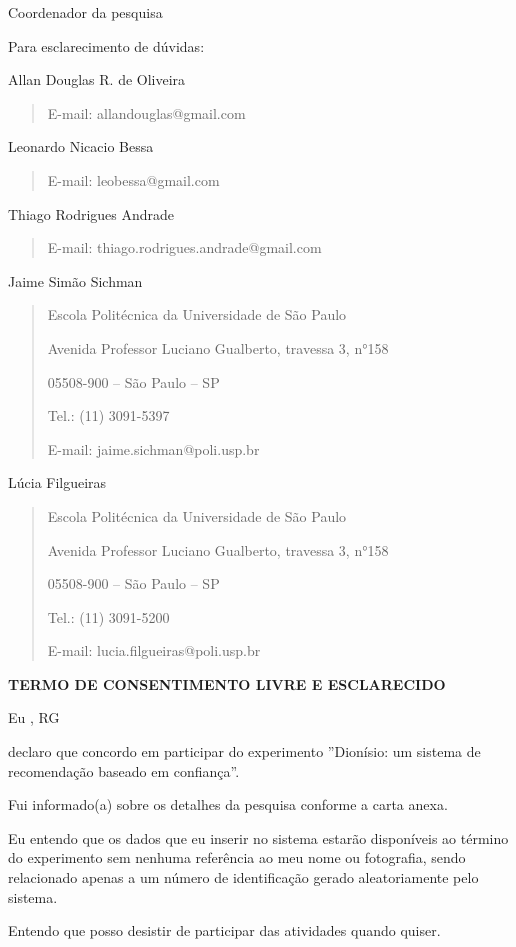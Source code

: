 Coordenador da pesquisa

\vspace{0.2in}

Para esclarecimento de dúvidas:

Allan Douglas R. de Oliveira
\begin{quote}
	E-mail: allandouglas@gmail.com
\end{quote}
Leonardo Nicacio Bessa
\begin{quote}
	E-mail: leobessa@gmail.com
\end{quote}	
Thiago Rodrigues Andrade
\begin{quote}
	E-mail: thiago.rodrigues.andrade@gmail.com
\end{quote}
Jaime Simão Sichman
\begin{quote}
Escola Politécnica da Universidade de São Paulo

Avenida Professor Luciano Gualberto, travessa 3, n°158

05508-900 – São Paulo – SP

Tel.: (11) 3091-5397

E-mail: jaime.sichman@poli.usp.br
\end{quote}
Lúcia Filgueiras
\begin{quote}
Escola Politécnica da Universidade de São Paulo

Avenida Professor Luciano Gualberto, travessa 3, n°158

05508-900 – São Paulo – SP

Tel.: (11) 3091-5200

E-mail: lucia.filgueiras@poli.usp.br
\end{quote}
\vspace{3.5in}
\centerline{\textbf{TERMO DE CONSENTIMENTO LIVRE E ESCLARECIDO}}

Eu \hspace{9.5cm}, RG \hspace{4.5cm} 

declaro que concordo em participar do experimento ''Dionísio: um sistema de recomendação baseado em confiança''.

Fui informado(a) sobre os detalhes da pesquisa conforme a carta anexa.

Eu entendo que os dados que eu inserir no sistema estarão disponíveis ao término do experimento sem nenhuma referência ao meu nome ou fotografia, sendo relacionado  apenas a um número de identificação gerado aleatoriamente pelo sistema.

Entendo que posso desistir de participar das atividades quando quiser. 

